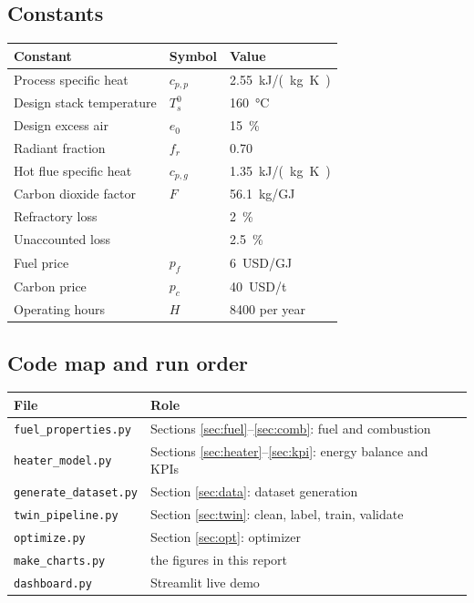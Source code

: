 \documentclass[11pt,a4paper]{article}
\begin{document}
\subsection{Constants}
\begin{table}[h]
\centering\small
\begin{tabular}{@{}lll@{}}
\toprule
Constant & Symbol & Value\\
\midrule
Process specific heat & $c_{p,p}$ & \SI{2.55}{kJ/(kg.K)}\\
Design stack temperature & $T_s^0$ & \SI{160}{\celsius}\\
Design excess air & $e_0$ & \SI{15}{\percent}\\
Radiant fraction & $f_r$ & 0.70\\
Hot flue specific heat & $c_{p,g}$ & \SI{1.35}{kJ/(kg.K)}\\
Carbon dioxide factor & $F$ & \SI{56.1}{kg/GJ}\\
Refractory loss & & \SI{2}{\percent}\\
Unaccounted loss & & \SI{2.5}{\percent}\\
Fuel price & $p_f$ & \SI{6}{USD/GJ}\\
Carbon price & $p_c$ & \SI{40}{USD/t}\\
Operating hours & $H$ & 8400 per year\\
\bottomrule
\end{tabular}
\end{table}

\subsection{Code map and run order}
\begin{table}[h]
\centering\small
\begin{tabular}{@{}ll@{}}
\toprule
File & Role\\
\midrule
\texttt{fuel\_properties.py} & Sections \ref{sec:fuel}--\ref{sec:comb}: fuel and combustion\\
\texttt{heater\_model.py} & Sections \ref{sec:heater}--\ref{sec:kpi}: energy balance and KPIs\\
\texttt{generate\_dataset.py} & Section \ref{sec:data}: dataset generation\\
\texttt{twin\_pipeline.py} & Section \ref{sec:twin}: clean, label, train, validate\\
\texttt{optimize.py} & Section \ref{sec:opt}: optimizer\\
\texttt{make\_charts.py} & the figures in this report\\
\texttt{dashboard.py} & Streamlit live demo\\
\bottomrule
\end{tabular}
\end{table}
\end{document}
